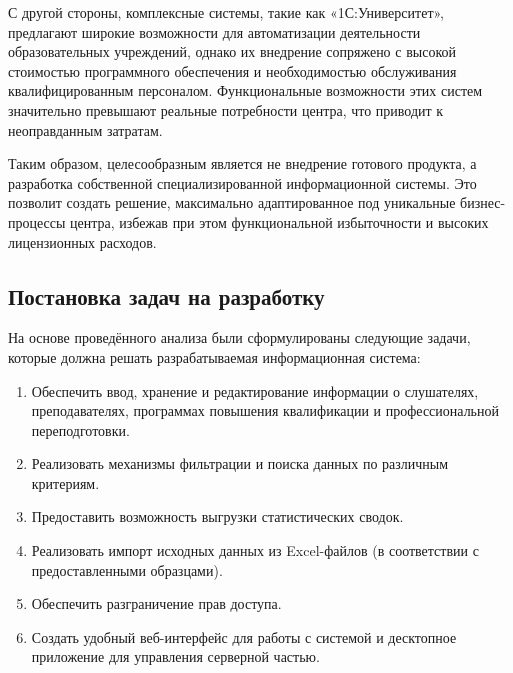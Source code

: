 С другой стороны, комплексные системы, такие как «1С:Университет», предлагают широкие возможности для автоматизации деятельности образовательных учреждений, однако их внедрение сопряжено с высокой стоимостью программного обеспечения и необходимостью обслуживания квалифицированным персоналом. Функциональные возможности этих систем значительно превышают реальные потребности центра, что приводит к неоправданным затратам.

Таким образом, целесообразным является не внедрение готового продукта, а разработка собственной специализированной информационной системы. Это позволит создать решение, максимально адаптированное под уникальные бизнес-процессы центра, избежав при этом функциональной избыточности и высоких лицензионных расходов.

\subsection{Постановка задач на разработку}

На основе проведённого анализа были сформулированы следующие задачи, которые должна решать разрабатываемая информационная система:

\begin{enumerate}
	\item Обеспечить ввод, хранение и редактирование информации о слушателях, преподавателях, программах повышения квалификации и профессиональной переподготовки.
	\item Реализовать механизмы фильтрации и поиска данных по различным критериям.
	\item Предоставить возможность выгрузки статистических сводок.
	\item Реализовать импорт исходных данных из Excel-файлов (в соответствии с предоставленными образцами).
	\item Обеспечить разграничение прав доступа.
	\item Создать удобный веб-интерфейс для работы с системой и десктопное приложение для управления серверной частью.
\end{enumerate}